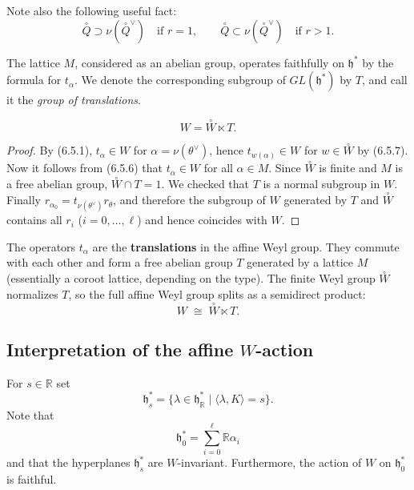 \documentclass[12pt]{article}
\begin{document}
Note also the following useful fact:
\begin{equation} \label{6.5.9}
    \overset{\circ}{Q} \supset \nu(\overset{\circ}{Q}^\vee) \quad \text{if $r=1$},
    \qquad 
    \overset{\circ}{Q} \subset \nu(\overset{\circ}{Q}^\vee) \quad \text{if $r>1$}.
\end{equation}

The lattice $M$, considered as an abelian group, operates faithfully on $\mathfrak{h}^*$ by the formula for $t_\alpha$. We denote the corresponding subgroup of $GL(\mathfrak{h}^*)$ by $T$, and call it the \emph{group of translations}.

\begin{proposition}[6.5]
\[
    W = \overset{\circ}{W} \ltimes T.
\]
\end{proposition}

\begin{proof}
By (6.5.1), $t_\alpha \in W$ for $\alpha = \nu(\theta^\vee)$, hence 
$t_{w(\alpha)} \in W$ for $w \in \overset{\circ}{W}$ by (6.5.7). Now it follows from (6.5.6) that 
$t_\alpha \in W$ for all $\alpha \in M$. Since $\overset{\circ}{W}$ is finite and $M$ is a free abelian 
group, $\overset{\circ}{W} \cap T = 1$. We checked that $T$ is a normal subgroup in $W$. Finally $r_{\alpha_0} = t_{\nu(\theta^\vee)} r_\theta$, and therefore the subgroup of $W$ 
generated by $T$ and $\overset{\circ}{W}$ contains all $r_i$ ($i=0,\dots,\ell$) and hence coincides 
with $W$.
\end{proof}


\begin{remark}
    The operators $t_\alpha$ are the \textbf{translations} in the affine Weyl group. They commute with each other and form a free abelian group $T$ generated by a lattice $M$ (essentially a coroot lattice, depending on the type). The finite Weyl group $\overset{\circ}{W}$ normalizes $T$, so the full affine Weyl group  splits as a semidirect product:
\[
    W \;\cong\; \overset{\circ}{W} \ltimes T.
\]
\end{remark}

\subsection*{Interpretation of the affine $W$-action}
For $s \in \mathbb{R}$ set
\[
    \mathfrak{h}^*_s = \{\lambda \in \mathfrak{h}^*_\mathbb{R} \mid \langle \lambda, K\rangle = s\}.
\]
Note that 
\[
    \mathfrak{h}^*_0 = \sum_{i=0}^\ell \mathbb{R}\alpha_i
\]
and that the hyperplanes $\mathfrak{h}^*_s$ are $W$-invariant. Furthermore, the action of $W$ on $\mathfrak{h}^*_0$ is faithful.
\end{document}
